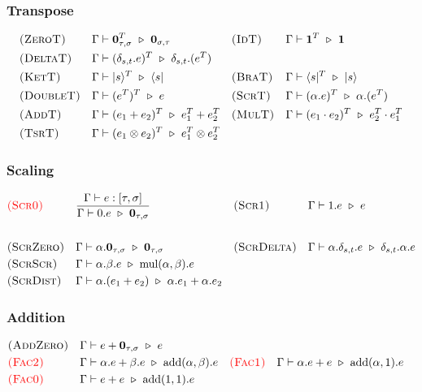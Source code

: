 \subsubsection*{Transpose}
\begin{align*}
  & \textsc{(ZeroT)} && \Gamma \vdash \textbf{0}_{\tau, \sigma}^T \ \triangleright\  \textbf{0}_{\sigma, \tau}
  && \textsc{(IdT)} && \Gamma \vdash \mathbf{1}^T \ \triangleright\  \mathbf{1} \\
  & \textsc{(DeltaT)} && \Gamma \vdash (\delta_{s,t}.e)^T \ \triangleright\  \delta_{s,t}.(e^T) \\
  & \textsc{(KetT)} && \Gamma \vdash |s\rangle^T \ \triangleright\  \langle s| 
  && \textsc{(BraT)} && \Gamma \vdash \langle s|^T \ \triangleright\  |s\rangle \\
  & \textsc{(DoubleT)} && \Gamma \vdash (e^T)^T \ \triangleright\  e 
  && \textsc{(ScrT)} && \Gamma \vdash (\alpha.e)^T \ \triangleright\  \alpha.(e^T) \\
  & \textsc{(AddT)} && \Gamma \vdash (e_1 + e_2)^T \ \triangleright\  e_1^T + e_2^T
  && \textsc{(MulT)} && \Gamma \vdash (e_1 \cdot e_2)^T \ \triangleright\  e_2^T \cdot e_1^T \\
  & \textsc{(TsrT)} && \Gamma \vdash (e_1 \otimes e_2)^T \ \triangleright\  e_1^T \otimes e_2^T
\end{align*}

\subsubsection*{Scaling}
\begin{align*}
  & \textcolor{red}{\textsc{(Scr0)}} && \frac{\Gamma \vdash e : [\tau, \sigma]}{\Gamma \vdash 0.e \ \triangleright\  \textbf{0}_{\tau, \sigma}}
  && \textsc{(Scr1)} && \Gamma \vdash 1.e \ \triangleright\  e \\
  \\
  & \textsc{(ScrZero)} && \Gamma \vdash \alpha.\mathbf{0}_{\tau, \sigma} \ \triangleright\  \mathbf{0}_{\tau, \sigma}
  && \textsc{(ScrDelta)} && \Gamma \vdash \alpha.\delta_{s, t}.e \ \triangleright\  \delta_{s, t}.\alpha.e \\
  & \textsc{(ScrScr)} && \Gamma \vdash \alpha.\beta.e \ \triangleright\  \mathrm{mul}(\alpha, \beta).e
  \\
  & \textsc{(ScrDist)} && \Gamma \vdash \alpha.(e_1 + e_2) \ \triangleright\  \alpha.e_1 + \alpha.e_2
\end{align*}

\subsubsection*{Addition}
\begin{align*}
  & \textsc{(AddZero)} && \Gamma \vdash e + \textbf{0}_{\tau, \sigma} \ \triangleright\  e \\
  & \textcolor{red}{\textsc{(Fac2)}} && 
    \Gamma \vdash \alpha.e + \beta.e \ \triangleright\  \mathrm{add}(\alpha, \beta).e
  && \textcolor{red}{\textsc{(Fac1)}} &&
    \Gamma \vdash \alpha.e + e \ \triangleright\  \mathrm{add}(\alpha, 1).e \\
  & \textcolor{red}{\textsc{(Fac0)}} &&
    \Gamma \vdash e + e \ \triangleright\  \mathrm{add}(1, 1).e
\end{align*}

